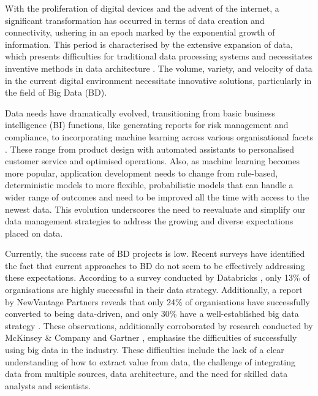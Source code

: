 \documentclass[preprint,12pt]{elsarticle}
\begin{document}
\label{sec:introduction} 

With the proliferation of digital devices and the advent of the internet, a significant transformation has occurred in terms of data creation and connectivity, ushering in an epoch marked by the exponential growth of information. This period is characterised by the extensive expansion of data, which presents difficulties for traditional data processing systems and necessitates inventive methods in data architecture \cite{AtaeiACIS, ataei2022state}. The volume, variety, and velocity of data in the current digital environment necessitate innovative solutions, particularly in the field of Big Data (BD).

Data needs have dramatically evolved, transitioning from basic business intelligence (BI) functions, like generating reports for risk management and compliance, to incorporating machine learning across various organisational facets \cite{ataei2023towards}. These range from product design with automated assistants to personalised customer service and optimised operations.  Also, as machine learning becomes more popular, application development needs to change from rule-based, deterministic models to more flexible, probabilistic models that can handle a wider range of outcomes and need to be improved all the time with access to the newest data. This evolution underscores the need to reevaluate and simplify our data management strategies to address the growing and diverse expectations placed on data.

Currently, the success rate of BD projects is low. Recent surveys have identified the fact that current approaches to BD do not seem to be effectively addressing these expectations. According to a survey conducted by Databricks \cite{DataBricksSurvey}, only 13\% of organisations are highly successful in their data strategy. Additionally, a report by NewVantage Partners reveals that only 24\% of organisations have successfully converted to being data-driven, and only 30\% have a well-established big data strategy \cite{newvantagepartners2023}. These observations, additionally corroborated by research conducted by McKinsey \& Company \cite{analytics2016age} and Gartner \cite{Nash}, emphasise the difficulties of successfully using big data in the industry. These difficulties include the lack of a clear understanding of how to extract value from data, the challenge of integrating data from multiple sources, data architecture, and the need for skilled data analysts and scientists. 
\end{document}
